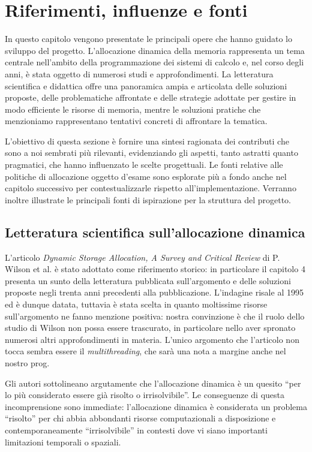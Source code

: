 \chapter{Riferimenti, influenze e fonti}

In questo capitolo vengono presentate le principali opere che hanno guidato lo sviluppo del progetto. L’allocazione dinamica della memoria rappresenta un tema centrale nell’ambito della programmazione dei sistemi di calcolo e, nel corso degli anni, è stata oggetto di numerosi studi e approfondimenti. La letteratura scientifica e didattica offre una panoramica ampia e articolata delle soluzioni proposte, delle problematiche affrontate e delle strategie adottate per gestire in modo efficiente le risorse di memoria, mentre le soluzioni pratiche che menzioniamo rappresentano tentativi concreti di affrontare la tematica. 

L’obiettivo di questa sezione è fornire una sintesi ragionata dei contributi che sono a noi sembrati più rilevanti, evidenziando gli aspetti, tanto astratti quanto pragmatici, che hanno influenzato le scelte progettuali. Le fonti relative alle politiche di allocazione oggetto d'esame sono esplorate più a fondo anche nel capitolo successivo per contestualizzarle rispetto all'implementazione. Verranno inoltre illustrate le principali fonti di ispirazione per la struttura del progetto.

\section{Letteratura scientifica sull’allocazione dinamica}

L’articolo \textit{Dynamic Storage Allocation, A Survey and Critical Review} di P. Wilson et al.\cite{wilson1995} è stato adottato come riferimento storico: in particolare il capitolo 4 presenta un sunto della letteratura pubblicata sull’argomento e delle soluzioni proposte negli trenta anni precedenti alla pubblicazione. L'indagine risale al 1995 ed è dunque datata, tuttavia è stata scelta in quanto moltissime risorse sull'argomento ne fanno menzione positiva: nostra convinzione è che il ruolo dello studio di Wilson non possa essere trascurato, in particolare nello aver spronato numerosi altri approfondimenti in materia. L'unico argomento che l'articolo non tocca sembra essere il \textit{multithreading}, che sarà una nota a margine anche nel nostro prog. 

Gli autori sottolineano argutamente che l'allocazione dinamica è un quesito ``per lo più considerato essere già risolto o irrisolvibile''. Le conseguenze di questa incomprensione sono immediate: l’allocazione dinamica è considerata un problema ``risolto'' per chi abbia abbondanti risorse computazionali a disposizione e contemporaneamente ``irrisolvibile'' in contesti dove vi siano importanti limitazioni temporali o spaziali. 

